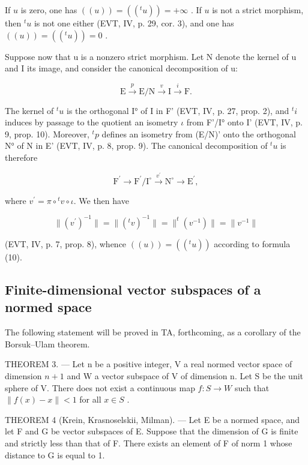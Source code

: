 If \(u\) is zero, one has \(((u)) = ((^t u)) = +\infty\) . If \(u\) is not a strict morphism, then \(^t u\) is not one either (EVT, IV, p. 29, cor. 3), and one has \(((u)) = ((^t u)) = 0\) .

Suppose now that u is a nonzero strict morphism. Let N denote the kernel of u and I its image, and consider the canonical decomposition of u:

\[
\mathrm{E} \xrightarrow {p} \mathrm{E/N} \xrightarrow {v} \mathrm{I} \xrightarrow {i} \mathrm{F}.
\]

The kernel of \(^{t}u\) is the orthogonal I° of I in F' (EVT, IV, p. 27, prop. 2), and \(^{t}i\) induces by passage to the quotient an isometry \(\iota\) from F'/I° onto I' (EVT, IV, p. 9, prop. 10). Moreover, \(^{t}p\) defines an isometry from (E/N)' onto the orthogonal N° of N in E' (EVT, IV, p. 8, prop. 9). The canonical decomposition of \(^{t}u\) is therefore

\[
\mathrm{F} ^ {\prime} \longrightarrow \mathrm{F} ^ {\prime} / \mathrm{I} ^ {\circ} \stackrel {v ^ {\prime}} {\longrightarrow} \mathrm{N} ^ {\circ} \longrightarrow \mathrm{E} ^ {\prime},
\]

where \(v^{\prime} = \pi \circ{}^{t}v\circ \iota\). We then have

\[
\| (v ^ {\prime}) ^ {- 1} \| = \| (^ {t} v) ^ {- 1} \| = \| ^ {t} (v ^ {- 1}) \| = \| v ^ {- 1} \|
\]

(EVT, IV, p. 7, prop. 8), whence \(((u)) = ((^t u))\) according to formula (10).

\subsection{Finite-dimensional vector subspaces of a normed space}

The following statement will be proved in TA, forthcoming, as a corollary of the Borsuk–Ulam theorem.

THEOREM 3. — Let n be a positive integer, V a real normed vector space of dimension \(n + 1\) and W a vector subspace of V of dimension n. Let S be the unit sphere of V. There does not exist a continuous map \(f: S \to W\) such that \(\|f(x) - x\| < 1\) for all \(x \in S\) .

THEOREM 4 (Krein, Krasnoselskii, Milman). — Let E be a normed space, and let F and G be vector subspaces of E. Suppose that the dimension of G is finite and strictly less than that of F. There exists an element of F of norm 1 whose distance to G is equal to 1.

